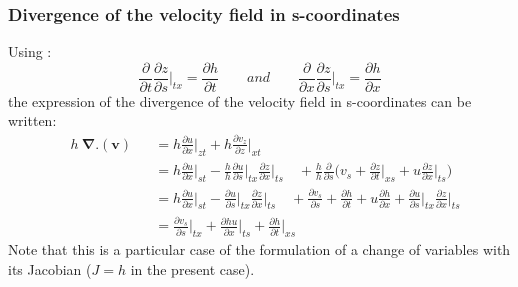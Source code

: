 \subsubsection{Divergence of the velocity field in s-coordinates}
Using :
\begin{equation}
 \displaystyle
 \frac{\partial}{\partial t} \frac{\partial z}{\partial s}\bigg\vert_{tx}= \frac{\partial h}{\partial t} \qquad and \qquad \frac{\partial}{\partial x} \frac{\partial z}{\partial s}\bigg\vert_{tx}= \frac{\partial h}{\partial x}
\end{equation}
%
the expression of the divergence of the velocity field in s-coordinates can be written:
\begin{subequations}
  \begin{alignat}{2}
  & h \ \mathbf{\nabla}.( \mathbf v) &&= h \frac{\partial u}{\partial x} \bigg \rvert_{zt} +h \frac{\partial v_z}{\partial z} \bigg \rvert_{xt}\\[4mm]
  & && = h \frac{\partial u}{\partial x} \bigg \rvert_{st} - \frac{h}{h} \frac{\partial u}{\partial s}\bigg \rvert_{tx} \frac{\partial z}{\partial x}\bigg \rvert_{ts}
  \quad + \frac{h}{h}  \frac{\partial}{\partial s} \bigg ( v_s + \frac{\partial z }{\partial t}\bigg \rvert_{xs} + u \frac{\partial z}{\partial x}\bigg \rvert_{ts} \bigg )\\[4mm]
  & && = h \frac{\partial u}{\partial x} \bigg \rvert_{st} -  \frac{\partial u}{\partial s}\bigg \rvert_{tx} \frac{\partial z}{\partial x}\bigg \rvert_{ts} 
  \quad +  \frac{\partial v_s}{\partial s} +  \frac{\partial h}{\partial t} + u \frac{\partial h}{\partial x} + \frac{\partial u}{\partial s}\bigg \rvert_{tx} \frac{\partial z}{\partial x}\bigg \rvert_{ts}\\[4mm]
  & && = \frac{\partial v_s}{\partial s}\bigg \rvert_{tx} + \frac{\partial h u}{\partial x} \bigg \rvert_{ts}+ \frac{\partial h}{\partial t}\bigg \rvert_{xs}
  \end{alignat}
\end{subequations}
Note that this is a particular case of the formulation of a change of variables with its Jacobian ($J=h$ in the present case). %
%
